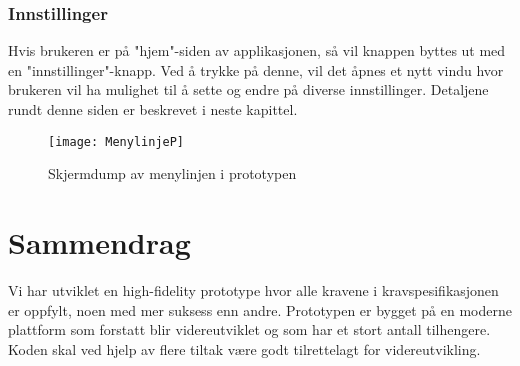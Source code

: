 \subsubsection{Innstillinger} 
Hvis brukeren er på "hjem"-siden av applikasjonen, så vil knappen byttes ut med en "innstillinger"-knapp. Ved å trykke på denne, vil det åpnes et nytt vindu hvor brukeren vil ha mulighet til å sette og endre på diverse innstillinger. Detaljene rundt denne siden er beskrevet i neste kapittel. 
 
 
\begin{figure}[ht!] 
\centering 
\texttt{[image: MenylinjeP]} 
\caption{Skjermdump av menylinjen i prototypen} 
\label{fig:menylinjen} 
\end{figure} 
 



\section{Sammendrag} 

Vi har utviklet en high-fidelity prototype hvor alle kravene i kravspesifikasjonen er oppfylt, noen med mer suksess enn andre. Prototypen er bygget på en moderne plattform som forstatt blir videreutviklet og som har et stort antall tilhengere. Koden skal ved hjelp av flere tiltak være godt tilrettelagt for videreutvikling. 




